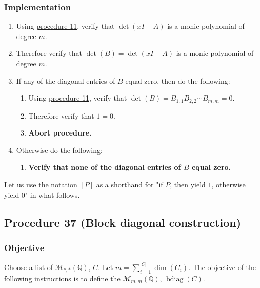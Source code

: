 \documentclass[twocolumn]{article}
\DeclareMathOperator{\bdiag}{bdiag}
\begin{document}
			\subsubsection{Implementation}
				\begin{enumerate}
					\item Using \hyperref[sec:procedure 11]{procedure 11}, verify that $\det(xI-A)$ is a monic polynomial of degree $m$.
					\item Therefore verify that $\det(B)=\det(xI-A)$ is a monic polynomial of degree $m$.
					\item If any of the diagonal entries of $B$ equal zero, then do the following:
					\begin{enumerate}
						\item Using \hyperref[sec:procedure 11]{procedure 11}, verify that $\det(B)=B_{1,1}B_{2,2}\cdots B_{m,m}=0$.
						\item Therefore verify that $1=0$.
						\item \textbf{Abort procedure.}
					\end{enumerate}
					\item Otherwise do the following:
					\begin{enumerate}
						\item \textbf{Verify that none of the diagonal entries of $B$ equal zero.}
					\end{enumerate}
				\end{enumerate}
			Let us use the notation $[P]$ as a shorthand for "if $P$, then yield $1$, otherwise yield $0$" in what follows.
		\subsection{Procedure 37 (Block diagonal construction)}\label{sec:procedure 37}
			\subsubsection{Objective}
				Choose a list of $\mathcal{M}_{*,*}(\mathbb{Q})$, $C$. Let $m=\sum_{i=1}^{\lvert C\rvert}\dim(C_i)$. The objective of the following instructions is to define the $\mathcal{M}_{m,m}(\mathbb{Q})$, $\bdiag(C)$.
\end{document}
